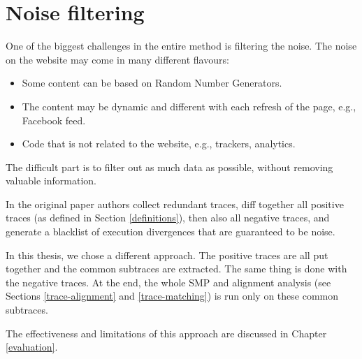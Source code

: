



\section{Noise filtering}

One of the biggest challenges in the entire method is filtering the noise.
The noise on the website may come in many different flavours:
\begin{itemize}
  \item Some content can be based on Random Number Generators.
  \item The content may be dynamic and different with each refresh of the page, e.g., Facebook feed.
  \item Code that is not related to the website, e.g., trackers, analytics.
\end{itemize}

The difficult part is to filter out as much data as possible, without removing valuable information.

In the original paper authors collect redundant traces, diff together all positive traces (as defined in Section \ref{definitions}),
then also all negative traces, and generate a blacklist of execution divergences that are guaranteed to be noise.

In this thesis, we chose a different approach. The positive traces are all put together and the common subtraces are extracted.
The same thing is done with the negative traces. 
At the end, the whole SMP and alignment analysis (see Sections \ref{trace-alignment} and \ref{trace-matching}) 
is run only on these common subtraces.

The effectiveness and limitations of this approach are discussed in Chapter \ref{evaluation}.
